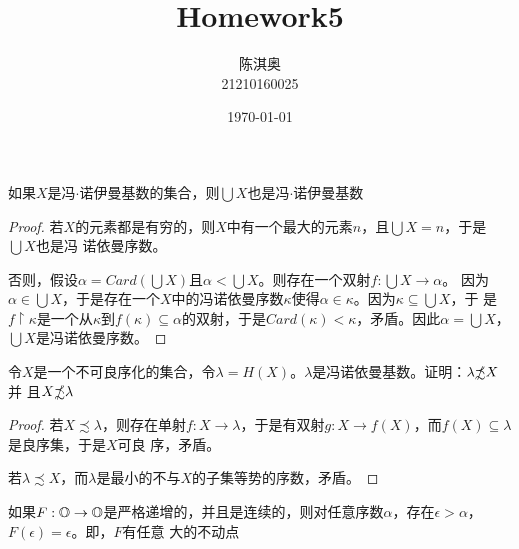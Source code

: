 \documentclass[11pt]{article}
\author{陈淇奥\\21210160025}
\date{\today}
\title{Homework5}
\begin{document}
\maketitle
\begin{exercise}[2.1.31]
如果\(X\)是冯\(\cdot\)诺伊曼基数的集合，则\(\bigcup X\)也是冯\(\cdot\)诺伊曼基数
\end{exercise}

\begin{proof}
若\(X\)的元素都是有穷的，则\(X\)中有一个最大的元素\(n\)，且\(\bigcup X=n\)，于是\(\bigcup X\)也是冯
诺依曼序数。

否则，假设\(\alpha=Card(\bigcup X)\)且\(\alpha<\bigcup X\)。则存在一个双射\(f:\bigcup X\to\alpha\)。
因为\(\alpha\in\bigcup X\)，于是存在一个\(X\)中的冯诺依曼序数\(\kappa\)使得\(\alpha\in\kappa\)。因为\(\kappa\subseteq\bigcup X\)，于
是\(f\upharpoonright\kappa\)是一个从\(\kappa\)到\(f(\kappa)\subseteq\alpha\)的双射，于是\(Card(\kappa)<\kappa\)，矛盾。因此\(\alpha=\bigcup X\)，
\(\bigcup X\)是冯诺依曼序数。
\end{proof}

\begin{exercise}[2.1.39]
令\(X\)是一个不可良序化的集合，令\(\lambda=H(X)\)。\(\lambda\)是冯诺依曼基数。证明：\(\lambda\slashed{\precsim} X\)并
且\(X\slashed{\precsim}\lambda\)
\end{exercise}

\begin{proof}
若\(X\precsim\lambda\)，则存在单射\(f:X\to\lambda\)，于是有双射\(g:X\to f(X)\)，而\(f(X)\subseteq\lambda\)是良序集，于是\(X\)可良
序，矛盾。

若\(\lambda\precsim X\)，而\(\lambda\)是最小的不与\(X\)的子集等势的序数，矛盾。
\end{proof}

\begin{exercise}[2.1.37]
如果\(F:\mathbb{O}\to\mathbb{O}\)是严格递增的，并且是连续的，则对任意序数\(\alpha\)，存在\(\epsilon>\alpha\)，\(F(\epsilon)=\epsilon\)。即，\(F\)有任意
大的不动点
\end{exercise}
\end{document}
